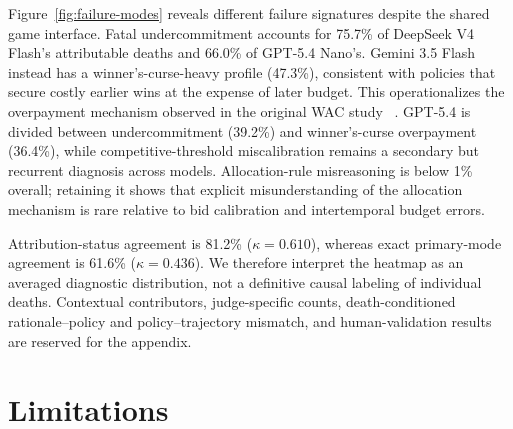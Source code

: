 \documentclass[letterpaper]{article} %
\begin{document}
Figure~\ref{fig:failure-modes} reveals different failure signatures despite
the shared game interface. Fatal undercommitment accounts for 75.7\% of
DeepSeek V4 Flash's attributable deaths and 66.0\% of GPT-5.4 Nano's. Gemini
3.5 Flash instead has a winner's-curse-heavy profile (47.3\%), consistent with
policies that secure costly earlier wins at the expense of later budget. This
operationalizes the overpayment mechanism observed in the original WAC study
~\cite{mao2025alympics}. GPT-5.4 is divided between undercommitment (39.2\%)
and winner's-curse overpayment (36.4\%), while competitive-threshold
miscalibration remains a secondary but recurrent diagnosis across models.
Allocation-rule misreasoning is below 1\% overall; retaining it shows that
explicit misunderstanding of the allocation mechanism is rare relative to
bid calibration and intertemporal budget errors.

Attribution-status agreement is 81.2\% ($\kappa=0.610$), whereas exact
primary-mode agreement is 61.6\% ($\kappa=0.436$). We therefore interpret the
heatmap as an averaged diagnostic distribution, not a definitive causal
labeling of individual deaths. Contextual contributors, judge-specific
counts, death-conditioned rationale--policy and policy--trajectory mismatch,
and human-validation results are reserved for the appendix.

\section{Limitations}
\end{document}
